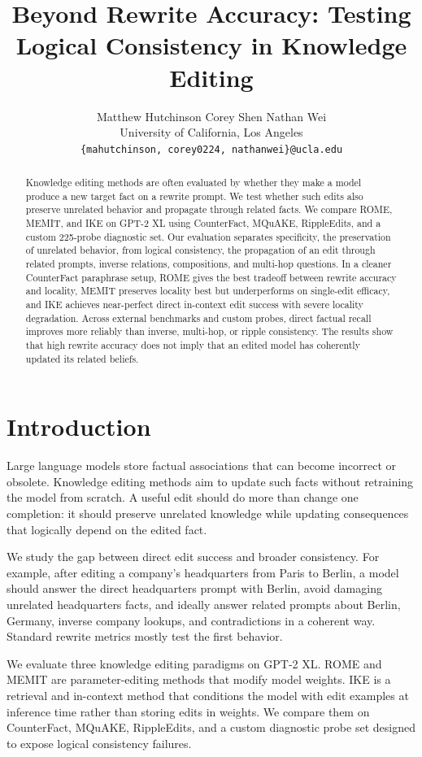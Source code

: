 \documentclass[11pt]{article}
\title{Beyond Rewrite Accuracy: Testing Logical Consistency in Knowledge Editing}
\author{
  Matthew Hutchinson \quad Corey Shen \quad Nathan Wei \\
  University of California, Los Angeles \\
  \texttt{\{mahutchinson, corey0224, nathanwei\}@ucla.edu}
}
\begin{document}
\maketitle

\begin{abstract}
Knowledge editing methods are often evaluated by whether they make a model produce a new target fact on a rewrite prompt. We test whether such edits also preserve unrelated behavior and propagate through related facts. We compare ROME, MEMIT, and IKE on GPT-2 XL using CounterFact, MQuAKE, RippleEdits, and a custom 225-probe diagnostic set. Our evaluation separates specificity, the preservation of unrelated behavior, from logical consistency, the propagation of an edit through related prompts, inverse relations, compositions, and multi-hop questions. In a cleaner CounterFact paraphrase setup, ROME gives the best tradeoff between rewrite accuracy and locality, MEMIT preserves locality best but underperforms on single-edit efficacy, and IKE achieves near-perfect direct in-context edit success with severe locality degradation. Across external benchmarks and custom probes, direct factual recall improves more reliably than inverse, multi-hop, or ripple consistency. The results show that high rewrite accuracy does not imply that an edited model has coherently updated its related beliefs.
\end{abstract}

\section{Introduction}

Large language models store factual associations that can become incorrect or obsolete. Knowledge editing methods aim to update such facts without retraining the model from scratch. A useful edit should do more than change one completion: it should preserve unrelated knowledge while updating consequences that logically depend on the edited fact.

We study the gap between direct edit success and broader consistency. For example, after editing a company's headquarters from Paris to Berlin, a model should answer the direct headquarters prompt with Berlin, avoid damaging unrelated headquarters facts, and ideally answer related prompts about Berlin, Germany, inverse company lookups, and contradictions in a coherent way. Standard rewrite metrics mostly test the first behavior.

We evaluate three knowledge editing paradigms on GPT-2 XL. ROME and MEMIT are parameter-editing methods that modify model weights. IKE is a retrieval and in-context method that conditions the model with edit examples at inference time rather than storing edits in weights. We compare them on CounterFact, MQuAKE, RippleEdits, and a custom diagnostic probe set designed to expose logical consistency failures.
\end{document}
